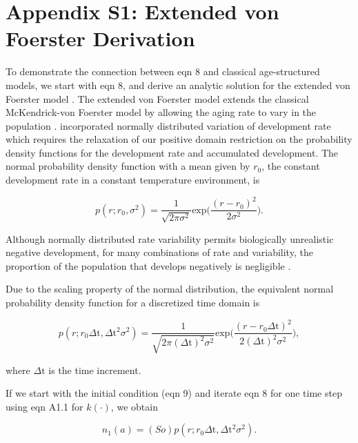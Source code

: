 \documentclass[12pt]{article}
\begin{document}
\section*{Appendix S1: Extended von Foerster Derivation}

To demonstrate the connection between eqn 8 and classical age-structured models, we start with eqn 8, and derive an analytic solution for the extended von Foerster model \citep{Gilbert2004}. The extended von Foerster model extends the classical McKendrick-von Foerster model \citep{McKendrick1926, vonFoerster1959} by allowing the aging rate to vary in the population \citep{Gilbert2004}. \citet{Gilbert2004} incorporated normally distributed variation of development rate which requires the relaxation of our positive domain restriction on the probability density functions for the development rate and accumulated development. The normal probability density function with a mean given by $r_0$, the constant development rate in a constant temperature environment, is

\begin{equation*}
p(r; r_0, \sigma^2) = \frac{1}{\sqrt{2\pi\sigma^2}}\text{exp}\bigg(\frac{(r - r_0)^2}{2\sigma^2}\bigg). \tag{eqn A1.1}
\end{equation*}

Although normally distributed rate variability permits biologically unrealistic negative development, for many combinations of rate and variability, the proportion of the population that develops negatively is negligible \citep{Gilbert2004}.

Due to the scaling property of the normal distribution, the equivalent normal probability density function for a discretized time domain is

\begin{equation*}
p(r; r_0\Delta\text{t}, \Delta\text{t}^2\sigma^2) = \frac{1}{\sqrt{2\pi(\Delta\text{t})^2\sigma^2}}\text{exp}\bigg(\frac{(r - r_0\Delta\text{t})^2}{2(\Delta\text{t})^2\sigma^2}\bigg), \tag{eqn A1.2}
\end{equation*}

where $\Delta\text{t}$ is the time increment.

If we start with the initial condition (eqn 9) and iterate eqn 8 for one time step using eqn A1.1 for $k(\cdot)$, we obtain

\begin{equation*}
n_1(a) = (So)p(r; r_0\Delta\text{t}, \Delta\text{t}^2\sigma^2). \tag{eqn A1.2}
\end{equation*}
\end{document}
